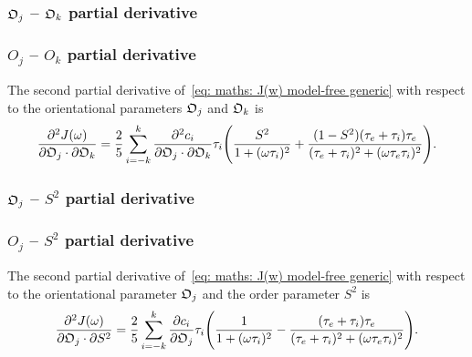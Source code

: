 \begin{latexonly}
    \subsubsection{$\mathfrak{O}_j$ -- $\mathfrak{O}_k$ partial derivative}
\end{latexonly}
\begin{htmlonly}
    \subsubsection{$O_j$ -- $O_k$ partial derivative}
\end{htmlonly}

The second partial derivative of~\eqref{eq: maths: J(w) model-free generic} with respect to the orientational parameters $\mathfrak{O}_j$ and $\mathfrak{O}_k$ is
\begin{equation}
    \frac{\partial^2 J(\omega)}{\partial \mathfrak{O}_j \cdot \partial \mathfrak{O}_k} = \frac{2}{5} \sum_{i=-k}^k
        \frac{\partial^2 c_i}{\partial \mathfrak{O}_j \cdot \partial \mathfrak{O}_k} \tau_i \Bigg(
            \frac{S^2}{1 + (\omega \tau_i)^2}
            + \frac{(1 - S^2)(\tau_e + \tau_i)\tau_e}{(\tau_e + \tau_i)^2 + (\omega \tau_e \tau_i)^2}
        \Bigg).
\end{equation}



\begin{latexonly}
    \subsubsection{$\mathfrak{O}_j$ -- $S^2$ partial derivative}
\end{latexonly}
\begin{htmlonly}
    \subsubsection{$O_j$ -- $S^2$ partial derivative}
\end{htmlonly}

The second partial derivative of~\eqref{eq: maths: J(w) model-free generic} with respect to the orientational parameter $\mathfrak{O}_j$ and the order parameter $S^2$ is
\begin{equation}
    \frac{\partial^2 J(\omega)}{\partial \mathfrak{O}_j \cdot \partial S^2} = \frac{2}{5} \sum_{i=-k}^k \frac{\partial c_i}{\partial \mathfrak{O}_j} \tau_i \Bigg(
        \frac{1}{1 + (\omega \tau_i)^2}
        - \frac{(\tau_e + \tau_i)\tau_e}{(\tau_e + \tau_i)^2 + (\omega \tau_e \tau_i)^2}
    \Bigg).
\end{equation}



